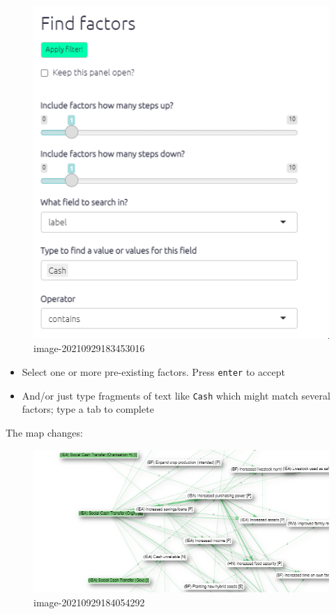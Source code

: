 \documentclass[
]{book}
\providecommand{\tightlist}{%
  \setlength{\itemsep}{0pt}\setlength{\parskip}{0pt}}
\begin{document}
\begin{figure}
\centering
\includegraphics[width=6.77083in,height=\textheight]{_assets/image-20210929183453016.png}
\caption{image-20210929183453016}
\end{figure}

\begin{itemize}
\tightlist
\item
  Select one or more pre-existing factors. Press \texttt{enter} to accept
\item
  And/or just type fragments of text like \texttt{Cash} which might match several factors; type a tab to complete
\end{itemize}

The map changes:

\begin{figure}
\centering
\includegraphics[width=6.77083in,height=\textheight]{_assets/image-20210929184054292.png}
\caption{image-20210929184054292}
\end{figure}
\end{document}
